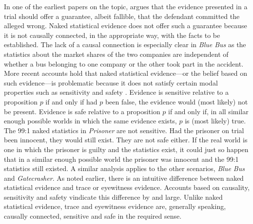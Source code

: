 \documentclass{article}
\begin{document}
In one of the earliest papers 
on the topic,
  \cite{Thomson86}  argues that the evidence presented in a trial should offer a guarantee, albeit fallible, that the defendant committed the alleged wrong. Naked statistical evidence does not offer such a guarantee because 
it is not causally connected, in the appropriate way, with the facts to be established.   The lack of a causal connection is especially clear in \textit{Blue Bus} as the statistics about the market shares of the two  companies are independent of whether a bus belonging to one company or the other  took part in the accident. %
%
More recent accounts hold that naked statistical evidence---or the belief based on such evidence---is problematic because it does not satisfy certain modal properties such as sensitivity  \citep{Enoch2012Statistical} and safety \citep{pritchard2015, pardo2018}. Evidence is sensitive relative to a proposition $p$ if and only if had $p$ been false, the evidence would (most likely) not be present. Evidence is safe relative to a proposition $p$ if and only if, in all similar enough possible worlds in which the same evidence exists, $p$ is (most likely) true. The 99:1 naked statistics in \textit{Prisoner} are not sensitive. Had the prisoner on trial been innocent, they would still exist. They are not safe either. If the real world is one in which the prisoner is guilty and the statistics exist, it could just so happen that in a similar enough possible world the prisoner was innocent and the 99:1 statistics still existed.  
A similar analysis applies to the other scenarios, \textit{Blue Bus} and \textit{Gatecrasher}.
%
%
%
As noted earlier, there is an intuitive difference between naked statistical evidence and trace or eyewitness evidence. Accounts based on causality, sensitivity and safety  vindicate this difference by and large. Unlike naked statistical evidence, trace and eyewitness evidence are, generally speaking, causally connected, sensitive and safe in the required sense. 
%
%
\end{document}
